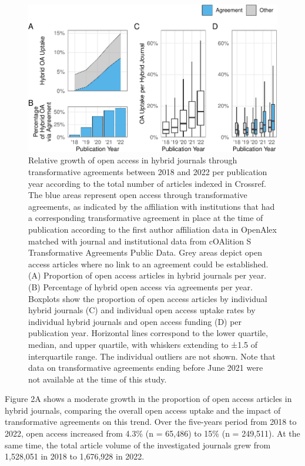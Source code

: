 \documentclass[a4paper,man,floatsintext,longtable,noextraspace,12pt]{apa6}
\begin{document}
\begin{figure}

{\centering \includegraphics[width=0.99\linewidth]{fig/unnamed-chunk-2-1} 

}

\caption{Relative growth of open access in hybrid journals through transformative agreements between 2018 and 2022 per publication year  according to the total number of articles indexed in Crossref. The blue areas represent open access through transformative agreements, as indicated by the affiliation with institutions that had a corresponding transformative agreement in place at the time of publication according to the first author affiliation data in OpenAlex matched with journal and institutional data from cOAlition S Transformative Agreements Public Data. Grey areas depict open access articles where no link to an agreement could be established. (A) Proportion of open access articles in hybrid journals per year. (B) Percentage of hybrid open access via agreements per year. Boxplots show the proportion of open access articles by individual hybrid journals (C) and individual open access uptake rates by individual hybrid journals and open access funding (D) per publication year. Horizontal lines correspond to the lower quartile, median, and upper quartile, with whiskers extending to ±1.5 of interquartile range. The individual outliers are not shown. Note that data on transformative agreements ending before June 2021 were not available at the time of this study.}\label{fig:unnamed-chunk-2}
\end{figure}

Figure 2A shows a moderate growth in the proportion of open access
articles in hybrid journals, comparing the overall open access uptake
and the impact of transformative agreements on this trend. Over the
five-years period from 2018 to 2022, open access increased from 4.3\% (n
= 65,486) to 15\% (n = 249,511). At the same time, the total article
volume of the investigated journals grew from 1,528,051 in 2018 to
1,676,928 in 2022.
\end{document}
